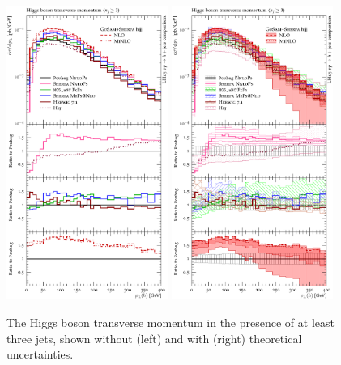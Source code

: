 \begin{figure}[t!]
  \centering
  \includegraphics[width=0.47\textwidth]{figures/hjetscomp_u_H_jjj_pT_incl.pdf}
  \hfill
  \includegraphics[width=0.47\textwidth]{figures/hjetscomp_H_jjj_pT_incl.pdf}
  \caption{
    The Higgs boson transverse momentum in the presence of at least three 
    jets, shown without (left) and with (right) theoretical uncertainties.
    \label{fig:hjetscomp:results:mobs:hpt_j3}
  }
\end{figure}


